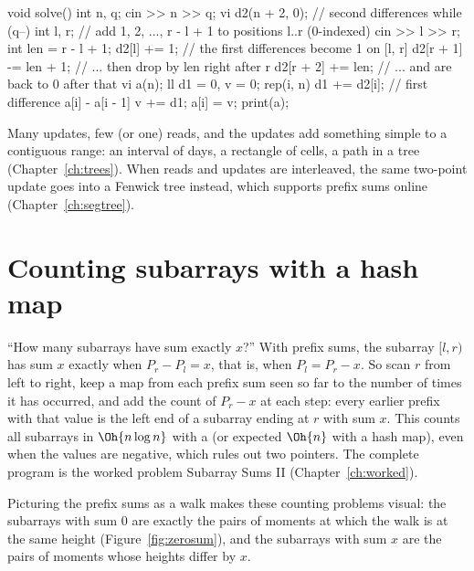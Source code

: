 \begin{code}
void solve() {
    int n, q;
    cin >> n >> q;
    vi d2(n + 2, 0);  // second differences
    while (q--) {
        int l, r;  // add 1, 2, ..., r - l + 1 to positions l..r (0-indexed)
        cin >> l >> r;
        int len = r - l + 1;
        d2[l] += 1;  // the first differences become 1 on [l, r]
        d2[r + 1] -= len + 1;  // ... then drop by len right after r
        d2[r + 2] += len;  // ... and are back to 0 after that
    }
    vi a(n);
    ll d1 = 0, v = 0;
    rep(i, n) {
        d1 += d2[i];  // first difference a[i] - a[i - 1]
        v += d1;
        a[i] = v;
    }
    print(a);
}
\end{code}

\begin{recognize}
Many updates, few (or one) reads, and the updates add something simple to a contiguous range: an interval of days, a
rectangle of cells, a path in a tree (Chapter~\ref{ch:trees}). When reads and updates are interleaved, the same two-point
update goes into a Fenwick tree instead, which supports prefix sums online (Chapter~\ref{ch:segtree}).
\end{recognize}

\section[Counting subarrays with a hash map]{Counting subarrays with a hash map \hfill \silver}\label{sec:prefix-hash}

``How many subarrays have sum exactly $x$?'' With prefix sums, the subarray $[l, r)$ has sum $x$ exactly when $P_r - P_l = x$,
that is, when $P_l = P_r - x$. So scan $r$ from left to right, keep a map from each prefix sum seen so far to the number of
times it has occurred, and add the count of $P_r - x$ at each step: every earlier prefix with that value is the left end of a
subarray ending at $r$ with sum $x$. This counts all subarrays in $\Oh{n \log n}$ with a  (or expected $\Oh{n}$ with
a hash map), even when the values are negative, which rules out two pointers. The complete program is the worked problem
Subarray Sums II (Chapter~\ref{ch:worked}).

Picturing the prefix sums as a walk makes these counting problems visual: the subarrays with sum 0 are exactly the pairs of
moments at which the walk is at the same height (Figure~\ref{fig:zerosum}), and the subarrays with sum $x$ are the pairs of
moments whose heights differ by $x$.


